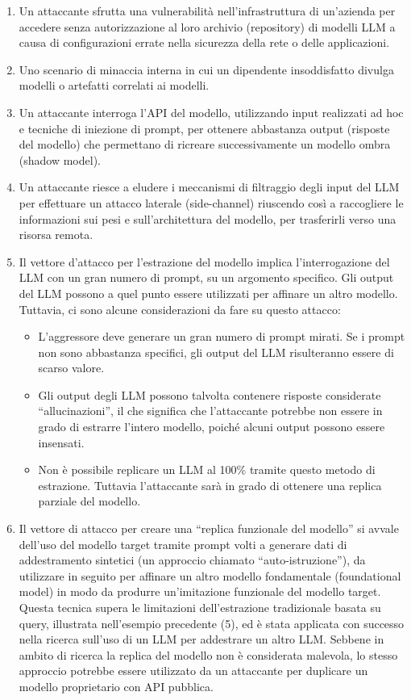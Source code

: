 \documentclass[
]{article}
\providecommand{\tightlist}{%
  \setlength{\itemsep}{0pt}\setlength{\parskip}{0pt}}
\begin{document}
\begin{enumerate}
\def\labelenumi{\arabic{enumi}.}
\tightlist
\item
  Un attaccante sfrutta una vulnerabilità nell'infrastruttura di
  un'azienda per accedere senza autorizzazione al loro archivio
  (repository) di modelli LLM a causa di configurazioni errate nella
  sicurezza della rete o delle applicazioni.
\item
  Uno scenario di minaccia interna in cui un dipendente insoddisfatto
  divulga modelli o artefatti correlati ai modelli.
\item
  Un attaccante interroga l'API del modello, utilizzando input
  realizzati ad hoc e tecniche di iniezione di prompt, per ottenere
  abbastanza output (risposte del modello) che permettano di ricreare
  successivamente un modello ombra (shadow model).
\item
  Un attaccante riesce a eludere i meccanismi di filtraggio degli input
  del LLM per effettuare un attacco laterale (side-channel) riuscendo
  così a raccogliere le informazioni sui pesi e sull'architettura del
  modello, per trasferirli verso una risorsa remota.
\item
  Il vettore d'attacco per l'estrazione del modello implica
  l'interrogazione del LLM con un gran numero di prompt, su un argomento
  specifico. Gli output del LLM possono a quel punto essere utilizzati
  per affinare un altro modello. Tuttavia, ci sono alcune considerazioni
  da fare su questo attacco:

  \begin{itemize}
  \tightlist
  \item
    L'aggressore deve generare un gran numero di prompt mirati. Se i
    prompt non sono abbastanza specifici, gli output del LLM
    risulteranno essere di scarso valore.
  \item
    Gli output degli LLM possono talvolta contenere risposte considerate
    ``allucinazioni'', il che significa che l'attaccante potrebbe non
    essere in grado di estrarre l'intero modello, poiché alcuni output
    possono essere insensati.
  \item
    Non è possibile replicare un LLM al 100\% tramite questo metodo di
    estrazione. Tuttavia l'attaccante sarà in grado di ottenere una
    replica parziale del modello.
  \end{itemize}
\item
  Il vettore di attacco per creare una ``replica funzionale del
  modello'' si avvale dell'uso del modello target tramite prompt volti a
  generare dati di addestramento sintetici (un approccio chiamato
  ``auto-istruzione''), da utilizzare in seguito per affinare un altro
  modello fondamentale (foundational model) in modo da produrre
  un'imitazione funzionale del modello target. Questa tecnica supera le
  limitazioni dell'estrazione tradizionale basata su query, illustrata
  nell'esempio precedente (5), ed è stata applicata con successo nella
  ricerca sull'uso di un LLM per addestrare un altro LLM. Sebbene in
  ambito di ricerca la replica del modello non è considerata malevola,
  lo stesso approccio potrebbe essere utilizzato da un attaccante per
  duplicare un modello proprietario con API pubblica.
\end{enumerate}
\end{document}
